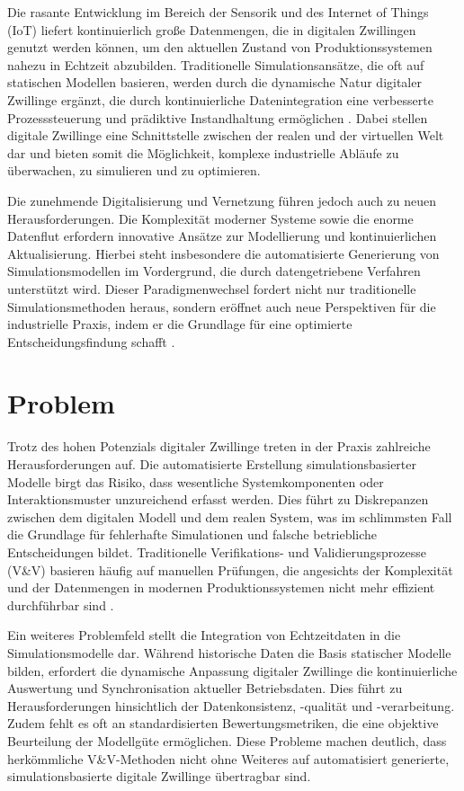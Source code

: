 Die rasante Entwicklung im Bereich der Sensorik und des Internet of Things (IoT) liefert kontinuierlich große Datenmengen, die in digitalen Zwillingen genutzt werden können, um den aktuellen Zustand von Produktionssystemen nahezu in Echtzeit abzubilden. Traditionelle Simulationsansätze, die oft auf statischen Modellen basieren, werden durch die dynamische Natur digitaler Zwillinge ergänzt, die durch kontinuierliche Datenintegration eine verbesserte Prozesssteuerung und prädiktive Instandhaltung ermöglichen \parencite{Tao2018}. Dabei stellen digitale Zwillinge eine Schnittstelle zwischen der realen und der virtuellen Welt dar und bieten somit die Möglichkeit, komplexe industrielle Abläufe zu überwachen, zu simulieren und zu optimieren.

Die zunehmende Digitalisierung und Vernetzung führen jedoch auch zu neuen Herausforderungen. Die Komplexität moderner Systeme sowie die enorme Datenflut erfordern innovative Ansätze zur Modellierung und kontinuierlichen Aktualisierung. Hierbei steht insbesondere die automatisierte Generierung von Simulationsmodellen im Vordergrund, die durch datengetriebene Verfahren unterstützt wird. Dieser Paradigmenwechsel fordert nicht nur traditionelle Simulationsmethoden heraus, sondern eröffnet auch neue Perspektiven für die industrielle Praxis, indem er die Grundlage für eine optimierte Entscheidungsfindung schafft \parencite{Uhlemann2017}.

\section{Problem}

Trotz des hohen Potenzials digitaler Zwillinge treten in der Praxis zahlreiche Herausforderungen auf. Die automatisierte Erstellung simulationsbasierter Modelle birgt das Risiko, dass wesentliche Systemkomponenten oder Interaktionsmuster unzureichend erfasst werden. Dies führt zu Diskrepanzen zwischen dem digitalen Modell und dem realen System, was im schlimmsten Fall die Grundlage für fehlerhafte Simulationen und falsche betriebliche Entscheidungen bildet. Traditionelle Verifikations- und Validierungsprozesse (V\&V) basieren häufig auf manuellen Prüfungen, die angesichts der Komplexität und der Datenmengen in modernen Produktionssystemen nicht mehr effizient durchführbar sind \parencite{Kritzinger2018}.

Ein weiteres Problemfeld stellt die Integration von Echtzeitdaten in die Simulationsmodelle dar. Während historische Daten die Basis statischer Modelle bilden, erfordert die dynamische Anpassung digitaler Zwillinge die kontinuierliche Auswertung und Synchronisation aktueller Betriebsdaten. Dies führt zu Herausforderungen hinsichtlich der Datenkonsistenz, -qualität und -verarbeitung. Zudem fehlt es oft an standardisierten Bewertungsmetriken, die eine objektive Beurteilung der Modellgüte ermöglichen. Diese Probleme machen deutlich, dass herkömmliche V\&V-Methoden nicht ohne Weiteres auf automatisiert generierte, simulationsbasierte digitale Zwillinge übertragbar sind.

